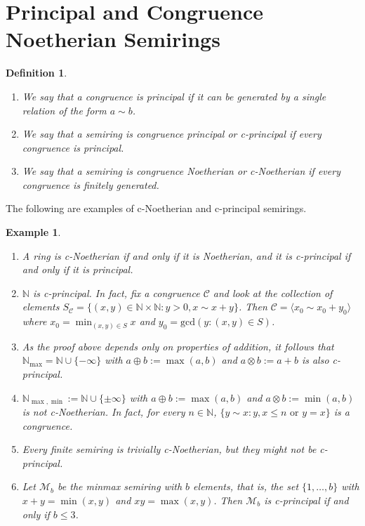 \documentclass[notitlepage, 10pt]{article}
\theoremstyle{defin}
\newtheorem{defn}{Definition}
\newtheorem{eg}{Example}[section]
\theoremstyle{theo}
\theoremstyle{rema}
\newcommand{\N}{\mathbb{N}}
\newcommand{\cC}{\mathcal{C}}
\newcommand{\cM}{\mathcal{M}}
\begin{document}
\section{Principal and Congruence Noetherian Semirings}\label{s3}

\begin{defn}\label{df1}
\begin{enumerate}
    \item We say that a congruence is \textit{principal} if it can be generated by a single relation of the form $a\sim b$.
    \item We say that a semiring is \textit{congruence principal} or \textit{c-principal} if every congruence is principal.
    \item We say that a semiring is \textit{congruence Noetherian} or \textit{c-Noetherian} if every congruence is finitely generated.
\end{enumerate}
\end{defn}

The following are examples of c-Noetherian and c-principal semirings.

\begin{eg}\label{e1}
    \begin{enumerate}
    \item A ring is c-Noetherian if and only if it is Noetherian, and it is c-principal if and only if it is principal.
    \item $\N$ is c-principal. In fact, fix a congruence $\cC$ and look at the collection of elements $S_\cC = \{(x,y)\in \N \times \N : y>0, x\sim x+y\}$. Then $\cC = \langle x_0 \sim x_0 + y_0\rangle$ where $x_0 = \min_{(x,y)\in S} x$ and $y_0 = \mathrm{gcd}(y: (x,y) \in S)$.
    \item As the proof above depends only on properties of addition, it follows that $\N_{\max} = \N \cup \{-\infty\}$ with $a\oplus b :=\max(a,b)$ and $a\otimes b :=a+b$ is also c-principal.
    \item $\N_{\max, \min} := \N \cup \{\pm \infty\}$ with $a\oplus b := \max(a,b)$ and $a\otimes b:= \min(a,b)$ is not c-Noetherian. In fact, for every $n\in \N$, $\{y\sim x : y, x \leq n\text{ or } y=x\}$ is a congruence. 
    \item Every finite semiring is trivially c-Noetherian, but they might not be c-principal.
    \item Let $\cM_b$ be the minmax semiring with $b$ elements, that is, the set $\{1,\ldots, b\}$ with $x+y = \min(x,y)$ and $xy=\max(x,y)$. Then $\cM_b$ is c-principal if and only if $b\leq 3$.
\end{enumerate}
\end{eg}
\end{document}
